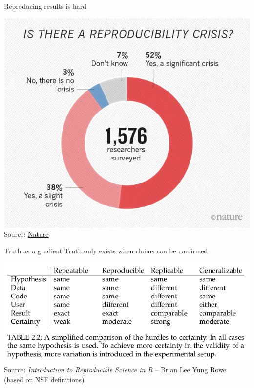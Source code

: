 \documentclass{beamer}
\newcommand{\citebook}{\tiny{Source: \emph{Introduction to Reproducible Science in R} -- Brian Lee Yung Rowe}}
\begin{document}
\begin{frame}{Reproducing results is hard}
\centering


\includegraphics[width=.6\linewidth]{images/reproducibility_nature}\\
\footnotesize{Source: \href{https://www.nature.com/news/1-500-scientists-lift-the-lid-on-reproducibility-1.19970}{Nature}}

\end{frame}



\begin{frame}{Truth as a gradient}
Truth only exists when claims can be confirmed

\includegraphics[width=\linewidth]{images/reproducibility_table}\\
\citebook ~ (based on NSF definitions)
\end{frame}
\end{document}
